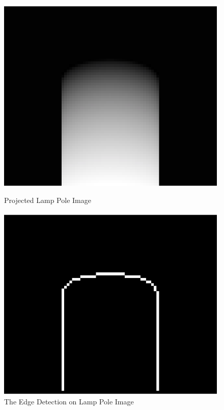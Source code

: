 \documentclass{cdcarta4}
\begin{document}
\begin{figure}[!htb]
    \begin{minipage}[t]{0.24\textwidth}
       \centering\includegraphics[width=\textwidth]{img/PoleFitImg}
       \caption{Projected Lamp Pole Image} \label{fig:polefitimg} 
    \end{minipage}%
    \begin{minipage}[t]{0.24\textwidth}
        \centering\includegraphics[width=\textwidth]{img/PoleFitEdge}
        \caption{The Edge Detection on Lamp Pole Image} \label{fig:polefitedge}
    \end{minipage}
\end{figure}
\end{document}
